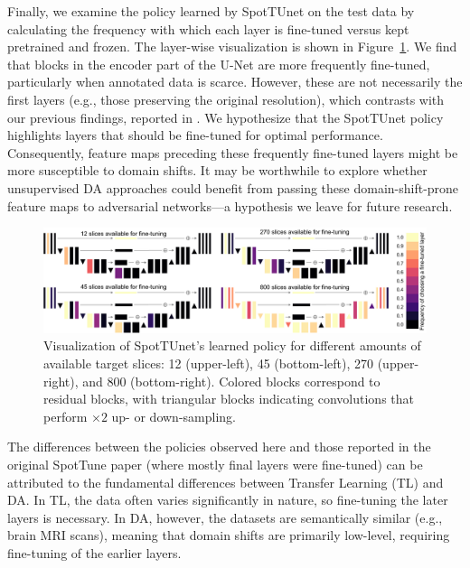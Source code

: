 Finally, we examine the policy learned by SpotTUnet on the test data by calculating the frequency with which each layer is fine-tuned versus kept pretrained and frozen. The layer-wise visualization is shown in Figure~\ref{fig:layerswise_template}. We find that blocks in the encoder part of the U-Net are more frequently fine-tuned, particularly when annotated data is scarce. However, these are not necessarily the first layers (e.g., those preserving the original resolution), which contrasts with our previous findings, reported in \cite{shirokikh2020first}. We hypothesize that the SpotTUnet policy highlights layers that should be fine-tuned for optimal performance. Consequently, feature maps preceding these frequently fine-tuned layers might be more susceptible to domain shifts. It may be worthwhile to explore whether unsupervised DA approaches \cite{dann_medim,zhao2021robust} could benefit from passing these domain-shift-prone feature maps to adversarial networks---a hypothesis we leave for future research.

\begin{landscape}
\begin{figure}[p]
	\centering
	\includegraphics[width=\linewidth]{Dissertation/Figures/2_mri/layerwise_template.pdf}
	\caption{Visualization of SpotTUnet's learned policy for different amounts of available target slices: 12 (upper-left), 45 (bottom-left), 270 (upper-right), and 800 (bottom-right). Colored blocks correspond to residual blocks, with triangular blocks indicating convolutions that perform $\times 2$ up- or down-sampling.}
	\label{fig:layerswise_template}
\end{figure}
\end{landscape}

The differences between the policies observed here and those reported in the original SpotTune paper \cite{guo2019spottune} (where mostly final layers were fine-tuned) can be attributed to the fundamental differences between Transfer Learning (TL) and DA. In TL, the data often varies significantly in nature, so fine-tuning the later layers is necessary. In DA, however, the datasets are semantically similar (e.g., brain MRI scans), meaning that domain shifts are primarily low-level, requiring fine-tuning of the earlier layers.


